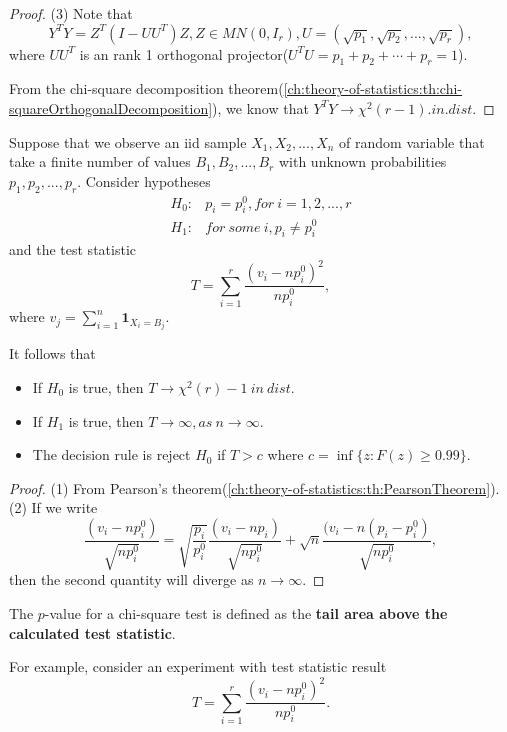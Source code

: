\begin{refsection}
\begin{proof}
	(3) Note that
	$$Y^TY = Z^T(I - UU^T)Z, Z\in MN(0,I_r), U = (\sqrt{p_1},\sqrt{p_2},...,\sqrt{p_r}),$$
	where $UU^T$ is an rank 1 orthogonal projector($U^TU = p_1+p_2+\cdots + p_r = 1$). 
	
	From the chi-square decomposition theorem(\autoref{ch:theory-of-statistics:th:chi-squareOrthogonalDecomposition}), we know that $Y^TY \to \chi^2(r-1) .in.dist$.
\end{proof}


\begin{theorem}\label{ch:theory-of-statistics:th:Chi-squareGoodnessOfFitTest}
	Suppose that we observe an iid sample $X_1,X_2,...,X_n$ of random variable that take a finite number of values $B_1,B_2,...,B_r$ with unknown probabilities $p_1,p_2,...,p_r$. Consider hypotheses
	\begin{align*}
	H_0:& p_i = p_i^0, for~ i=1,2,...,r \\
	H_1:& for~some~i, p_i \neq p_i^0 
	\end{align*}	
	and the test statistic
	$$T = \sum_{i=1}^r \frac{(v_i - np_i^0)^2}{np_i^0},$$
	where $v_j = \sum_{i=1}^n \bm{1}_{X_i = B_j}.$
	
	It follows that
	\begin{itemize}
		\item If $H_0$ is true, then $T\to \chi^2(r)-1 ~in~dist$.
		\item If $H_1$ is true, then $T\to \infty, as ~ n\to \infty$.
		\item The decision rule is reject $H_0$ if $T > c$ where $c = \inf\{z:F(z)\geq 0.99\}.$
	\end{itemize}
\end{theorem}
\begin{proof}
	(1) From Pearson's theorem(\autoref{ch:theory-of-statistics:th:PearsonTheorem}). (2) If we write
	$$\frac{(v_i - np_i^0)}{\sqrt{np_i^0}} = \sqrt{\frac{p_i}{p_i^0}}\frac{(v_i - np_i)}{\sqrt{np_i^0}} + \sqrt{n}\frac{(v_i - n(p_i-p_i^0)}{\sqrt{np_i^0}},$$
	then the second quantity will diverge as $n\to \infty$.
\end{proof}


\begin{note}
The $p$-value for a chi-square test is defined as the \textbf{tail area above the calculated test statistic}.

For example, consider an experiment with test statistic result
$$ T = \sum_{i=1}^r \frac{(v_i - np_i^0)^2}{np_i^0}.$$


\end{note}
\end{refsection}
